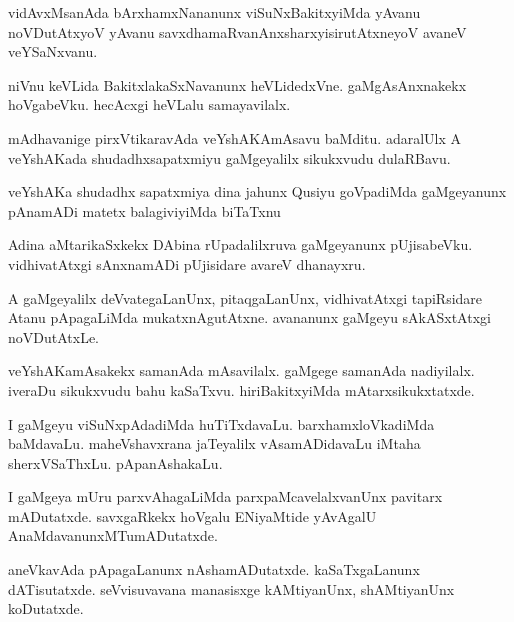 \documentclass{article}
\begin{document}
\begin{mn}%
vidAvxMsanAda bArxhamxNananunx viSuNxBakitxyiMda yAvanu noVDutAtxyoV yAvanu 
savxdhamaRvanAnxsharxyisirutAtxneyoV avaneV veYSaNxvanu.
\end{mn}

\begin{mn}%
niVnu keVLida BakitxlakaSxNavanunx heVLidedxVne. gaMgAsAnxnakekx hoVgabeVku. hecAcxgi 
heVLalu samayavilalx.
\end{mn}

\begin{mn}%
mAdhavanige pirxVtikaravAda veYshAKAmAsavu baMditu. adaralUlx A veYshAKada 
shudadhxsapatxmiyu gaMgeyalilx sikukxvudu dulaRBavu.
\end{mn}

\begin{mn}%
veYshAKa shudadhx sapatxmiya dina jahunx Qusiyu goVpadiMda gaMgeyanunx pAnamADi matetx 
balagiviyiMda biTaTxnu
\end{mn}

\begin{mn}%
Adina aMtarikaSxkekx DAbina rUpadalilxruva gaMgeyanunx pUjisabeVku. vidhivatAtxgi sAnxnamADi 
pUjisidare avareV dhanayxru.
\end{mn}

\begin{mn}%
A gaMgeyalilx deVvategaLanUnx, pitaqgaLanUnx, vidhivatAtxgi tapiRsidare Atanu pApagaLiMda 
mukatxnAgutAtxne. avananunx gaMgeyu sAkASxtAtxgi noVDutAtxLe.
\end{mn}

\begin{mn}%
veYshAKamAsakekx samanAda mAsavilalx. gaMgege samanAda nadiyilalx. iveraDu sikukxvudu 
bahu kaSaTxvu. hiriBakitxyiMda mAtarxsikukxtatxde.
\end{mn}

\begin{mn}%
I gaMgeyu viSuNxpAdadiMda huTiTxdavaLu. barxhamxloVkadiMda baMdavaLu. maheVshavxrana 
jaTeyalilx vAsamADidavaLu iMtaha sherxVSaThxLu. pApanAshakaLu.
\end{mn}

\begin{mn}%
I gaMgeya mUru parxvAhagaLiMda parxpaMcavelalxvanUnx pavitarx mADutatxde. savxgaRkekx 
hoVgalu ENiyaMtide yAvAgalU AnaMdavanunxMTumADutatxde.
\end{mn}

\begin{mn}%
aneVkavAda pApagaLanunx nAshamADutatxde. kaSaTxgaLanunx dATisutatxde. seVvisuvavana 
manasisxge kAMtiyanUnx, shAMtiyanUnx koDutatxde.
\end{mn}
\end{document}
